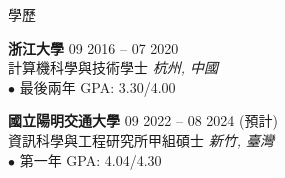 \documentclass{resume}
\begin{document}
\vspace{-1em}
\begin{rSection}{學歷}

{\bf 浙江大學} \hfill {09 2016 -- 07 2020}\\
計算機科學與技術學士 \hfill \textit{杭州, 中國}\\
$\bullet$ 最後兩年 GPA: 3.30/4.00

{\bf 國立陽明交通大學} \hfill {09 2022 -- 08 2024 (預計)}\\
資訊科學與工程研究所甲組碩士 \hfill \textit{新竹, 臺灣}\\
$\bullet$ 第一年 GPA: 4.04/4.30

\end{rSection}
\end{document}
